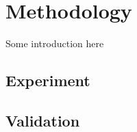 \chapter{Methodology}
\label{ch:method}

Some introduction here

\section{Experiment}
\label{sec:exp}


\section{Validation}
\label{sec:valid}

